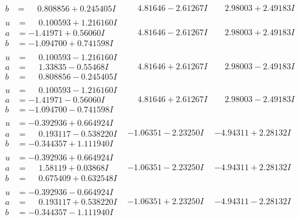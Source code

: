 \documentclass[1p]{elsarticle_modified}
\theoremstyle{definition}
\begin{document}
$$\begin{array}{c|c|c}
\begin{aligned}
b &= \phantom{-}0.808856 + 0.245405 I\end{aligned}
 & \phantom{-}4.81646 - 2.61267 I & \phantom{-}2.98003 + 2.49183 I \\ \hline\begin{aligned}
u &= \phantom{-}0.100593 + 1.216160 I \\
a &= -1.41971 + 0.56060 I \\
b &= -1.094700 + 0.741598 I\end{aligned}
 & \phantom{-}4.81646 - 2.61267 I & \phantom{-}2.98003 + 2.49183 I \\ \hline\begin{aligned}
u &= \phantom{-}0.100593 - 1.216160 I \\
a &= \phantom{-}1.33835 - 0.55468 I \\
b &= \phantom{-}0.808856 - 0.245405 I\end{aligned}
 & \phantom{-}4.81646 + 2.61267 I & \phantom{-}2.98003 - 2.49183 I \\ \hline\begin{aligned}
u &= \phantom{-}0.100593 - 1.216160 I \\
a &= -1.41971 - 0.56060 I \\
b &= -1.094700 - 0.741598 I\end{aligned}
 & \phantom{-}4.81646 + 2.61267 I & \phantom{-}2.98003 - 2.49183 I \\ \hline\begin{aligned}
u &= -0.392936 + 0.664924 I \\
a &= \phantom{-}0.193117 - 0.538220 I \\
b &= -0.344357 + 1.111940 I\end{aligned}
 & -1.06351 - 2.23250 I & -4.94311 + 2.28132 I \\ \hline\begin{aligned}
u &= -0.392936 + 0.664924 I \\
a &= \phantom{-}1.58119 + 0.03868 I \\
b &= \phantom{-}0.675409 + 0.632548 I\end{aligned}
 & -1.06351 - 2.23250 I & -4.94311 + 2.28132 I \\ \hline\begin{aligned}
u &= -0.392936 - 0.664924 I \\
a &= \phantom{-}0.193117 + 0.538220 I \\
b &= -0.344357 - 1.111940 I\end{aligned}
 & -1.06351 + 2.23250 I & -4.94311 - 2.28132 I \\ \hline\begin{aligned}

\end{aligned}
\end{array}$$
\end{document}

